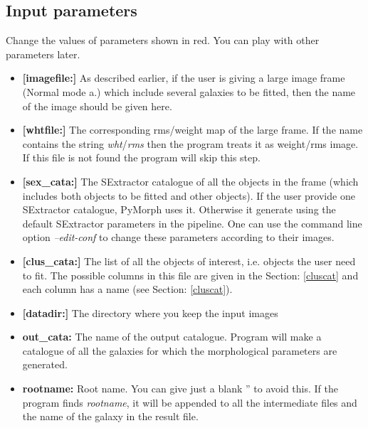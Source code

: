 \documentclass[a4paper,10pt]{article}
\newcommand{\red}[1]{{\color{red}[#1]}}
\begin{document}
\subsection{Input parameters}
\label{inputp}
Change the values of parameters shown in red. You can play with other parameters later.
\begin{itemize}
\item \textbf{\red{imagefile:}} As described earlier, if the user is giving a large image frame (Normal mode a.) which include several galaxies to be fitted, then the name of the image should be given here. %

\item \textbf{\red{whtfile:}} The corresponding rms/weight map of the large frame. If the name contains the string \textit{wht}/\textit{rms} then the program treats it as weight/rms image. If this file is not found the program will skip this step. 

\item \textbf{\red{sex\_cata:}} The SExtractor catalogue of all the objects in the frame (which includes both objects to be fitted and other objects). If the user provide one SExtractor catalogue, PyMorph uses it. Otherwise it generate using the default SExtractor parameters in the pipeline. One can use the command line option \textit{--edit-conf} to change these parameters according to their images.

\item \textbf{\red{clus\_cata:}} The list of all the objects of interest, i.e. objects the user need to fit. The possible columns in this file are given in the Section: \ref{cluscat} and each column has a name (see Section: \ref{cluscat}). %

\item \textbf{\red{datadir:}} The directory where you keep the input images

\item \textbf{out\_cata:} The name of the output catalogue. Program will make a catalogue of all the galaxies for which the morphological parameters are generated.

\item \textbf{rootname:} Root name. You can give just a blank '' to avoid this. If the program finds \textit{rootname}, it will be appended to all the intermediate files and the name of the galaxy in the result file.


\end{itemize}
\end{document}
